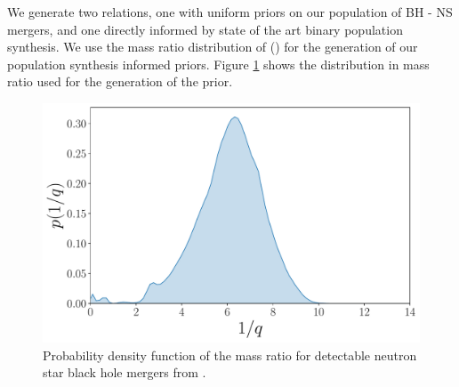 \documentclass[twocolumn]{aastex631}
\begin{document}
	We generate two relations, one with uniform priors on our population of BH - NS mergers, and one directly informed by state of the art binary population synthesis. We use the mass ratio distribution of \cite{2021Broekgaarden+}  () for the generation of our population synthesis informed priors. Figure \ref{fig:mass ratio distrbution} shows the distribution in mass ratio used for the generation of the prior. 
	\begin{figure}
		\centering
		\includegraphics[width=\linewidth]{NSBH_mass_ratio_density.pdf}
		\caption{Probability density function of the mass ratio for detectable neutron star black hole mergers from \citep{2021Broekgaarden+}.}
		\label{fig:mass ratio distrbution}
	\end{figure}
\end{document}
